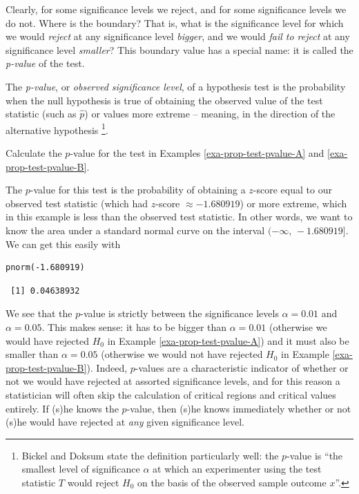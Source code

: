 \documentclass[captions=tableheading]{scrbook}
\begin{document}
Clearly, for some significance levels we reject, and for some significance levels we do not. Where is the boundary? That is, what is the significance level for which we would \emph{reject} at any significance level \emph{bigger}, and we would \emph{fail to reject} at any significance level \emph{smaller}? This boundary value has a special name: it is called the \emph{p-value} of the test.

\begin{defn}
The \emph{p-value}, or \emph{observed significance level}, of a hypothesis test is the probability when the null hypothesis is true of obtaining the observed value of the test statistic (such as \(\hat{p}\)) or values more extreme -- meaning, in the direction of the alternative hypothesis
\footnote{Bickel and Doksum \cite{Bickel2001} state the definition particularly well: the \(p\)-value is ``the smallest level of significance \(\alpha\) at which an experimenter using the test statistic \(T\) would reject \(H_{0}\) on the basis of the observed sample outcome \(x\)''.}. 
\end{defn}

\begin{example}
Calculate the \(p\)-value for the test in Examples \ref{exa-prop-test-pvalue-A} and \ref{exa-prop-test-pvalue-B}.

The \(p\)-value for this test is the probability of obtaining a \(z\)-score equal to our observed test statistic (which had \(z\)-score \(\approx-1.680919\)) or more extreme, which in this example is less than the observed test statistic. In other words, we want to know the area under a standard normal curve on the interval \((-\infty,\,-1.680919]\). We can get this easily with
\end{example}


\lstset{language=R}
\begin{lstlisting}
pnorm(-1.680919)
\end{lstlisting}

\begin{verbatim}
 [1] 0.04638932
\end{verbatim}

We see that the \(p\)-value is strictly between the significance levels \(\alpha=0.01\) and \(\alpha=0.05\). This makes sense: it has to be bigger than \(\alpha=0.01\) (otherwise we would have rejected \(H_{0}\) in Example \ref{exa-prop-test-pvalue-A}) and it must also be smaller than \(\alpha=0.05\) (otherwise we would not have rejected \(H_{0}\) in Example \ref{exa-prop-test-pvalue-B}). Indeed, \(p\)-values are a characteristic indicator of whether or not we would have rejected at assorted significance levels, and for this reason a statistician will often skip the calculation of critical regions and critical values entirely. If (s)he knows the \(p\)-value, then (s)he knows immediately whether or not (s)he would have rejected at \emph{any} given significance level.
\end{document}

